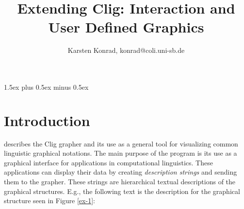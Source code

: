 
\parindent0mm \parskip1.5ex plus 0.5ex minus 0.5ex
\pagestyle{plain}  %
\setcounter{tocdepth}{4}
\setcounter{secnumdepth}{4}
\makeindex
\frenchspacing
\textheight 22cm %

\setlength{\arraycolsep}{0.0mm}
\def\epsfsize#1#2{\epsfxsize}

\newcommand{\indexentry}[2]
{\item #1 #2}

\newcommand{\toindex}[1]
{\index{#1}#1}

\newcommand{\itindex}[1]
{\index{#1}{\em #1}}

\newcommand{\fig}[1]{fig. \ref{#1}}

\hyphenation{}





\title{Extending {\sc Clig}: Interaction and User Defined Graphics}

\author{Karsten Konrad, konrad@coli.uni-sb.de}



\maketitle



\newpage
\tableofcontents
\newpage

\section{Introduction}

\cite{konrad 95a} describes the {\sc Clig} grapher and its use as a
general tool for visualizing common linguistic graphical notations. The
main purpose of the program is its use as a graphical interface for
applications in computational linguistics. These applications can
display their data by creating {\it description strings\/} and sending
them to the grapher. These strings are hierarchical textual
descriptions of the graphical structures. E.g., the following text is
the description for the graphical structure seen in Figure \ref{ex-1}:

